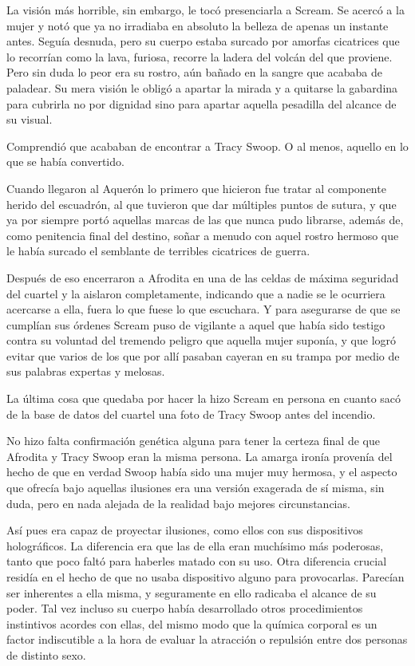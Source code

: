 La visión más horrible, sin embargo, le tocó presenciarla a Scream. Se acercó a la mujer y notó que ya no irradiaba en absoluto la belleza de apenas un instante antes. Seguía desnuda, pero su cuerpo estaba surcado por amorfas cicatrices que lo recorrían como la lava, furiosa, recorre la ladera del volcán del que proviene. Pero sin duda lo peor era su rostro, aún bañado en la sangre que acababa de paladear. Su mera visión le obligó a apartar la mirada y a quitarse la gabardina para cubrirla no por dignidad sino para apartar aquella pesadilla del alcance de su visual.

Comprendió que acababan de encontrar a Tracy Swoop. O al menos, aquello en lo que se había convertido.

\parbreak
Cuando llegaron al Aquerón lo primero que hicieron fue tratar al componente herido del escuadrón, al que tuvieron que dar múltiples puntos de sutura, y que ya por siempre portó aquellas marcas de las que nunca pudo librarse, además de, como penitencia final del destino, soñar a menudo con aquel rostro hermoso que le había surcado el semblante de terribles cicatrices de guerra.

Después de eso encerraron a Afrodita en una de las celdas de máxima seguridad del cuartel y la aislaron completamente, indicando que a nadie se le ocurriera acercarse a ella, fuera lo que fuese lo que escuchara. Y para asegurarse de que se cumplían sus órdenes Scream puso de vigilante a aquel que había sido testigo contra su voluntad del tremendo peligro que aquella mujer suponía, y que logró evitar que varios de los que por allí pasaban cayeran en su trampa por medio de sus palabras expertas y melosas.

La última cosa que quedaba por hacer la hizo Scream en persona en cuanto sacó de la base de datos del cuartel una foto de Tracy Swoop antes del incendio.

No hizo falta confirmación genética alguna para tener la certeza final de que Afrodita y Tracy Swoop eran la misma persona. La amarga ironía provenía del hecho de que en verdad Swoop había sido una mujer muy hermosa, y el aspecto que ofrecía bajo aquellas ilusiones era una versión exagerada de sí misma, sin duda, pero en nada alejada de la realidad bajo mejores circunstancias.

Así pues era capaz de proyectar ilusiones, como ellos con sus dispositivos holográficos. La diferencia era que las de ella eran muchísimo más poderosas, tanto que poco faltó para haberles matado con su uso. Otra diferencia crucial residía en el hecho de que no usaba dispositivo alguno para provocarlas. Parecían ser inherentes a ella misma, y seguramente en ello radicaba el alcance de su poder. Tal vez incluso su cuerpo había desarrollado otros procedimientos instintivos acordes con ellas, del mismo modo que la química corporal es un factor indiscutible a la hora de evaluar la atracción o repulsión entre dos personas de distinto sexo.

